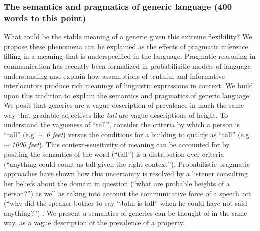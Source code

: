 \documentclass[10pt,letterpaper]{article}
\begin{document}
\subsubsection{The semantics and pragmatics of generic language  (400 words to this point)}

What could be the stable meaning of a generic given this extreme flexibility? 
We propose these phenomena can be explained as the effects of pragmatic inference filling in a meaning that is underspecified in the language. 
Pragmatic reasoning in communication has recently been formalized in probabilisitic models of language understanding \cite{Frank2012, Goodman2013, Franke2009} and explain how assumptions of truthful and informative interlocutors \cite{Clark1996, Grice1975, Levinson2000} produce rich meanings of linguistic expressions in context. 
We build upon this tradition to explain the semantics and pragmatics of generic language: We posit that generics are a vague description of prevalence in much the same way that gradable adjectives like \emph{tall} are vague descriptions of height. 
To understand the vagueness of ``tall'', consider the criteria by which a person is ``tall'' (e.g. \emph{$\sim$ 6 feet}) versus the conditions for a building to qualify as ``tall'' (e.g. \emph{$\sim$ 1000 feet}).
This context-sensitivity of meaning can be accounted for by positing the semantics of the word (``tall'') is a distribution over criteria (``anything could count as tall given the right context''). 
Probabilistic pragmatic approaches have shown how this uncertainty is resolved by a listener consulting her beliefs about the domain in question (``what are probable heights of a person?'') as well as taking into account the communicative force of a speech act (``why did the speaker bother to say ``John is tall'' when he could have not said anything?'') \cite{Lassiter2013, Qing2014}.
We present a semantics of generics can be thought of in the same way, as a vague description of the prevalence of a property.
%
%
%
%
%
\end{document}
